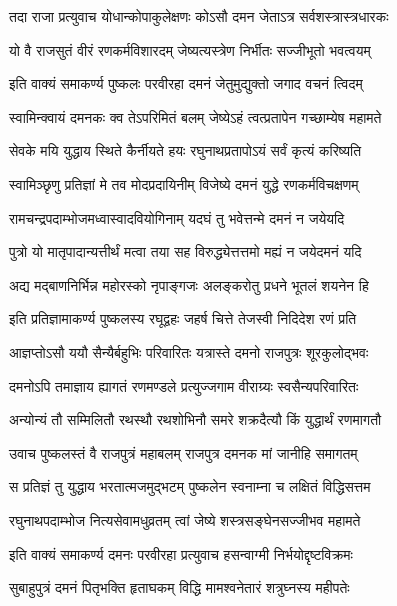 \twolineshloka
{तदा राजा प्रत्युवाच योधान्कोपाकुलेक्षणः}
{कोऽसौ दमन जेताऽत्र सर्वशस्त्रास्त्रधारकः}%

\twolineshloka
{यो वै राजसुतं वीरं रणकर्मविशारदम्}
{जेष्यत्यस्त्रेण निर्भीतः सज्जीभूतो भवत्वयम्}%

\twolineshloka
{इति वाक्यं समाकर्ण्य पुष्कलः परवीरहा}
{दमनं जेतुमुद्युक्तो जगाद वचनं त्विदम्}%

\twolineshloka
{स्वामिन्क्वायं दमनकः क्व तेऽपरिमितं बलम्}
{जेष्येऽहं त्वत्प्रतापेन गच्छाम्येष महामते}%

\twolineshloka
{सेवके मयि युद्धाय स्थिते कैर्नीयते हयः}
{रघुनाथप्रतापोऽयं सर्वं कृत्यं करिष्यति}%

\twolineshloka
{स्वामिञ्छृणु प्रतिज्ञां मे तव मोदप्रदायिनीम्}
{विजेष्ये दमनं युद्धे रणकर्मविचक्षणम्}%

\twolineshloka
{रामचन्द्रपदाम्भोजमध्वास्वादवियोगिनाम्}
{यदघं तु भवेत्तन्मे दमनं न जयेयदि}%

\twolineshloka
{पुत्रो यो मातृपादान्यत्तीर्थं मत्वा तया सह}
{विरुद्ध्येत्तत्तमो मह्यं न जयेदमनं यदि}%

\twolineshloka
{अद्य मद्बाणनिर्भिन्न महोरस्को नृपाङ्गजः}
{अलङ्करोतु प्रधने भूतलं शयनेन हि}%


\twolineshloka
{इति प्रतिज्ञामाकर्ण्य पुष्कलस्य रघूद्वहः}
{जहर्ष चित्ते तेजस्वी निदिदेश रणं प्रति}%

\twolineshloka
{आज्ञप्तोऽसौ ययौ सैन्यैर्बहुभिः परिवारितः}
{यत्रास्ते दमनो राजपुत्रः शूरकुलोद्भवः}%

\twolineshloka
{दमनोऽपि तमाज्ञाय ह्यागतं रणमण्डले}
{प्रत्युज्जगाम वीराग्र्यः स्वसैन्यपरिवारितः}%

\twolineshloka
{अन्योन्यं तौ सम्मिलितौ रथस्थौ रथशोभिनौ}
{समरे शक्रदैत्यौ किं युद्धार्थं रणमागतौ}%

\twolineshloka
{उवाच पुष्कलस्तं वै राजपुत्रं महाबलम्}
{राजपुत्र दमनक मां जानीहि समागतम्}%

\twolineshloka
{स प्रतिज्ञं तु युद्धाय भरतात्मजमुद्भटम्}
{पुष्कलेन स्वनाम्ना च लक्षितं विद्धिसत्तम}%

\twolineshloka
{रघुनाथपदाम्भोज नित्यसेवामधुव्रतम्}
{त्वां जेष्ये शस्त्रसङ्घेनसज्जीभव महामते}%

\twolineshloka
{इति वाक्यं समाकर्ण्य दमनः परवीरहा}
{प्रत्युवाच हसन्वाग्मी निर्भयोद्दृष्टविक्रमः}%

\twolineshloka
{सुबाहुपुत्रं दमनं पितृभक्ति हृताघकम्}
{विद्धि मामश्वनेतारं शत्रुघ्नस्य महीपतेः}%

